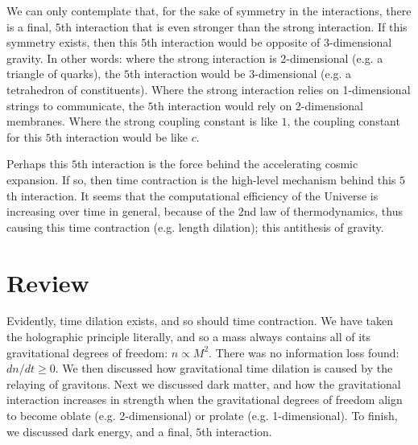 \documentclass[12pt]{article}
\begin{document}
{We can only contemplate that, for the sake of symmetry in the interactions, there is a final, $5$th interaction that is even stronger than the strong interaction.
If this symmetry exists, then this $5$th interaction would be opposite of 3-dimensional gravity.
In other words: where the strong interaction is 2-dimensional (e.g. a triangle of quarks), the $5$th interaction would be 3-dimensional (e.g. a tetrahedron of constituents).
Where the strong interaction relies on 1-dimensional strings to communicate, the $5$th interaction would rely on 2-dimensional membranes.
Where the strong coupling constant is like $1$, the coupling constant for this $5$th interaction would be like $c$.


Perhaps this $5$th interaction is the force behind the accelerating cosmic expansion.
If so, then time contraction is the high-level mechanism behind this $5$th interaction.
It seems that the computational efficiency of the Universe is increasing over time in general, because of the $2$nd law of thermodynamics, thus causing this time contraction (e.g. length dilation); this antithesis of gravity.








\section{Review}

Evidently, time dilation exists, and so should time contraction.
We have taken the holographic principle literally, and so a mass always contains all of its gravitational degrees of freedom: $n \propto M^2$.
There was no information loss found: $dn/dt \geq 0$.
We then discussed how gravitational time dilation is caused by the relaying of gravitons.
Next we discussed dark matter, and how the gravitational interaction increases in strength when the gravitational degrees of freedom align to become oblate (e.g. 2-dimensional) or prolate (e.g. 1-dimensional).
To finish, we discussed dark energy, and a final, $5$th interaction.

}
\end{document}
